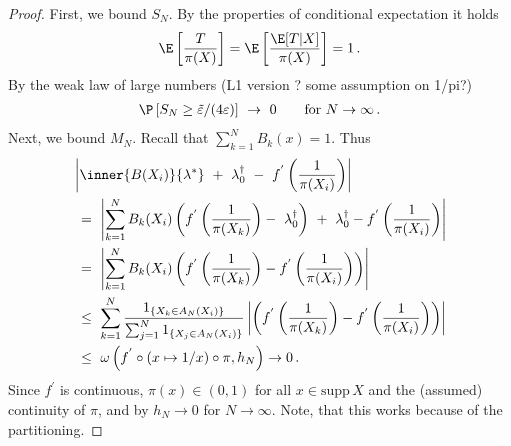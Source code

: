\begin{proof}
First, we bound $S_N$.
By the properties of conditional expectation it holds
\begin{gather*}
  \E
  \left[ 
    \frac{T}{\pi(X)}
  \right]
  =
  \E
  \left[ 
    \frac{\E[T|X]}{\pi(X)}
  \right]
  =1
  \,.
\end{gather*}
By the weak law of large numbers (L1 version ? some assumption on 1/pi?)
\begin{gather}
  \P
  \left[ 
    S_N
    \ge
\tilde{\varepsilon}
/(4\varepsilon)
  \right]
  \ 
  \to 
  \ 
  0
  \qquad 
  \text{for}\ 
  N\to \infty
  \,.
\end{gather}
Next, we bound $M_N$.
Recall that $\sum_{k=1}^{N}B_k(x)=1$. Thus
\begin{align*}
  &
\left| 
        \inner
       {B(X_i)}
       {\lambda^*}
      \ 
       +
      \ 
      \lambda^\dagger_0
      \ 
        -
        \ 
        f^{'}
        \left( 
          \frac{1}{\pi(X_i)}
     \right)
\right|
      \\
      &
      \ 
      =
      \ 
      \left| 
      \sum_{k=1}^{N} 
      B_k(X_i)
      \left( 
        f^{'}
        \left( 
          \frac{1}{\pi(X_k)}
     \right)
  -
  \ 
  \lambda_0^\dagger
      \right)
      \ 
      +
      \ 
      \lambda_0^\dagger
      -
        f^{'}
        \left( 
          \frac{1}{\pi(X_i)}
     \right)
      \right|
      \\
      &
      \ 
      =
      \ 
      \left| 
      \sum_{k=1}^{N} 
      B_k(X_i)
      \left( 
        f^{'}
        \left( 
          \frac{1}{\pi(X_k)}
     \right)
     -
        f^{'}
        \left( 
          \frac{1}{\pi(X_i)}
     \right)
      \right)
      \right|
      \\
      &
      \ 
      \le
      \ 
      \sum_{k=1}^{N} 
      \frac{1_{\left\{ X_k\in A_N(X_i) \right\}}}
      {
        \sum_{j=1}^{N} 
1_{\left\{ X_j\in A_N(X_i) \right\}}
      }
      \left| 
      \left( 
        f^{'}
        \left( 
          \frac{1}{\pi(X_k)}
     \right)
     -
        f^{'}
        \left( 
          \frac{1}{\pi(X_i)}
     \right)
      \right)
      \right|
      \\
      &
      \ 
      \le
      \ 
      \omega
      \left( f^{'}\circ (x\mapsto1/x)\circ \pi,h_N \right)
      \to
      0
      \,.
\end{align*}
Since $f^{'}$ is continuous, $\pi(x)\in(0,1)$ for all $x\in \mathrm{supp}\,X$ and the (assumed) continuity of $\pi$, and by $h_N\to 0$ for $N\to\infty$.
Note, that this works because of the partitioning.



\end{proof}
